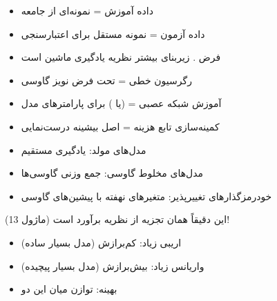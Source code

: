 

\begin{itemize}
\tightlist
\item
  داده آموزش = نمونه‌ای از جامعه
\item
  داده آزمون = نمونه مستقل برای اعتبارسنجی
\item
  فرض . زیربنای بیشتر نظریه یادگیری ماشین است
\end{itemize}


\begin{itemize}
\tightlist
\item
  رگرسیون خطی =  تحت فرض نویز گاوسی
\item
  آموزش شبکه عصبی =  (یا ) برای پارامترهای مدل
\item
  کمینه‌سازی تابع هزینه = اصل بیشینه درست‌نمایی
\end{itemize}


\begin{itemize}
\tightlist
\item
  مدل‌های مولد: یادگیری مستقیم 
\item
  مدل‌های مخلوط گاوسی: جمع وزنی گاوسی‌ها
\item
  خودرمزگذارهای تغییرپذیر: متغیرهای نهفته با پیشین‌های گاوسی
\end{itemize}



این دقیقاً همان تجزیه  از نظریه برآورد است (ماژول 13)!

\begin{itemize}
\tightlist
\item
  اریبی زیاد: کم‌برازش (مدل بسیار ساده)
\item
  واریانس زیاد: بیش‌برازش (مدل بسیار پیچیده)
\item
  بهینه: توازن میان این دو
\end{itemize}


